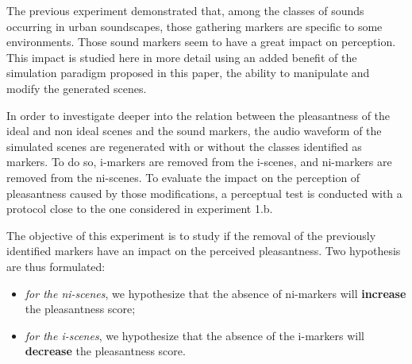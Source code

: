 \documentclass[12pt]{elsarticle}
\begin{document}
The previous experiment demonstrated that, among the classes of sounds occurring in urban soundscapes, those gathering markers are specific to some environments. Those sound markers seem to have a great impact on perception. This impact is studied here in more detail using an added benefit of the simulation paradigm proposed in this paper, the ability to manipulate and modify the generated scenes.


In order to investigate deeper into the relation between the pleasantness of the ideal and non ideal scenes and the sound markers, the audio waveform of the simulated scenes are regenerated with or without the classes identified as markers. To do so, i-markers are removed from the i-scenes, and ni-markers are removed from the ni-scenes. To evaluate the impact on the perception of pleasantness caused by those modifications, a perceptual test is conducted with a protocol close to the one considered in experiment 1.b.


The objective of this experiment is to study if the removal of the previously identified markers have an impact on the perceived pleasantness. Two hypothesis are thus formulated:


\begin{itemize}
\item \emph{for the ni-scenes}, we hypothesize that the absence of ni-markers will \textbf{increase} the pleasantness score;
\item \emph{for the i-scenes}, we hypothesize that the absence of the i-markers will \textbf{decrease} the pleasantness score.
\end{itemize}
\end{document}
